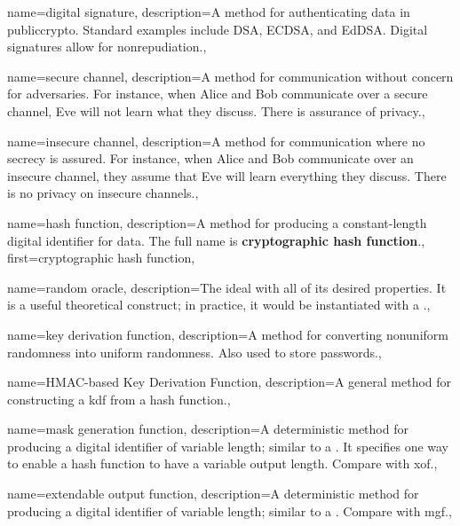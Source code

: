 {
    name={digital signature},
    description={A method for authenticating data in \gls{publiccrypto}.
        Standard examples include DSA, ECDSA, and EdDSA.
        Digital signatures allow for nonrepudiation.},
}

{
    name={secure channel},
    description={A method for communication without concern for adversaries.
        For instance, when Alice and Bob communicate over a secure channel,
        Eve will not learn what they discuss.
        There is assurance of privacy.},
}

{
    name={insecure channel},
    description={A method for communication where no secrecy is assured.
        For instance, when Alice and Bob communicate over an insecure channel,
        they assume that Eve will learn everything they discuss.
        There is no privacy on insecure channels.},
}

{
    name={hash function},
    description={A method for producing a constant-length digital identifier
        for data.
        The full name is \textbf{cryptographic hash function}.},
    first={cryptographic hash function},
}

{
    name={random oracle},
    description={The ideal 
        with all of its desired properties.
        It is a useful theoretical construct;
        in practice, it would be instantiated with a
        .},
}

{
    name={key derivation function},
    description={A method for converting nonuniform randomness into
        uniform randomness.
        Also used to store passwords.},
}

{
    name={HMAC-based Key Derivation Function},
    description={A general method for constructing
        a \gls{kdf} from a \gls{hash function}.},
}

{
    name={mask generation function},
    description={A deterministic method for producing a digital identifier
        of variable length;
        similar to a .
        It specifies one way to enable a \gls{hash function}
        to have a variable output length.
        Compare with \gls{xof}.},
}

{
    name={extendable output function},
    description={A deterministic method for producing a digital identifier
        of variable length;
        similar to a .
        Compare with \gls{mgf}.},
}

